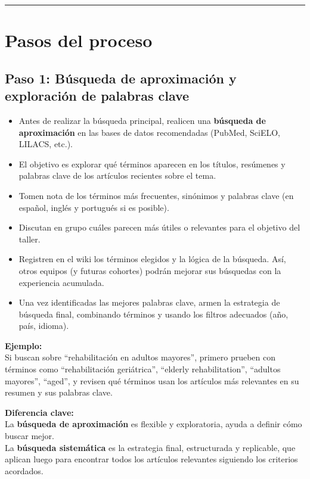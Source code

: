 \documentclass[
  letterpaper,
]{book}
\providecommand{\tightlist}{%
  \setlength{\itemsep}{0pt}\setlength{\parskip}{0pt}}\usepackage{longtable,booktabs,array}
\begin{document}
\begin{center}\rule{0.5\linewidth}{0.5pt}\end{center}

\section{Pasos del proceso}\label{pasos-del-proceso}

\subsection{Paso 1: Búsqueda de aproximación y exploración de palabras
clave}\label{paso-1-buxfasqueda-de-aproximaciuxf3n-y-exploraciuxf3n-de-palabras-clave}

\begin{itemize}
\tightlist
\item
  Antes de realizar la búsqueda principal, realicen una \textbf{búsqueda
  de aproximación} en las bases de datos recomendadas (PubMed, SciELO,
  LILACS, etc.).
\item
  El objetivo es explorar qué términos aparecen en los títulos,
  resúmenes y palabras clave de los artículos recientes sobre el tema.
\item
  Tomen nota de los términos más frecuentes, sinónimos y palabras clave
  (en español, inglés y portugués si es posible).
\item
  Discutan en grupo cuáles parecen más útiles o relevantes para el
  objetivo del taller.
\item
  Registren en el wiki los términos elegidos y la lógica de la búsqueda.
  Así, otros equipos (y futuras cohortes) podrán mejorar sus búsquedas
  con la experiencia acumulada.
\item
  Una vez identificadas las mejores palabras clave, armen la estrategia
  de búsqueda final, combinando términos y usando los filtros adecuados
  (año, país, idioma).
\end{itemize}

\textbf{Ejemplo:}\\
Si buscan sobre ``rehabilitación en adultos mayores'', primero prueben
con términos como ``rehabilitación geriátrica'', ``elderly
rehabilitation'', ``adultos mayores'', ``aged'', y revisen qué términos
usan los artículos más relevantes en su resumen y sus palabras clave.

\textbf{Diferencia clave:}\\
La \textbf{búsqueda de aproximación} es flexible y exploratoria, ayuda a
definir cómo buscar mejor.\\
La \textbf{búsqueda sistemática} es la estrategia final, estructurada y
replicable, que aplican luego para encontrar todos los artículos
relevantes siguiendo los criterios acordados.
\end{document}
